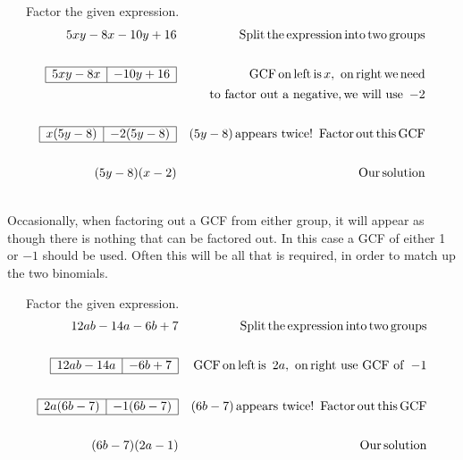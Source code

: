 \begin{example}~~~Factor the given expression.
  \begin{eqnarray*}
    5 x y - 8 x - 10 y + 16 &  & \operatorname{Split} \operatorname{the} \operatorname{expression}
    \operatorname{into} \operatorname{two} \operatorname{groups}\\
&&\\
    \begin{array}{|l|l|}
      \hline
      5 x y - 8 x & - 10 y + 16\\
      \hline
    \end{array} &  & \operatorname{GCF} \operatorname{on} \operatorname{left} \operatorname{is} x, \operatorname{~on}
    \operatorname{right} \operatorname{we} \operatorname{need}\\
		&& ~~~\operatorname{to~factor~out~a~negative}, \operatorname{we~will~use~} - 2\\
&&\\
    \begin{array}{|l|l|}
      \hline
      x (5 y - 8) & - 2 (5 y - 8)\\
      \hline
    \end{array} &  & (5 y - 8) \operatorname{appears~twice} !
    \operatorname{~Factor} \operatorname{out} \operatorname{this} \operatorname{GCF}\\
&&\\
    (5 y - 8) (x - 2) &  & \operatorname{Our} \operatorname{solution}
  \end{eqnarray*}
\end{example}
  ~\\
Occasionally, when factoring out a GCF from either group, it will appear as though there is nothing that can be factored out.  In this case a GCF of either 1 or $- 1$ should be used. Often this will be all that is required, in order to match up the two binomials.

\begin{example}~~~Factor the given expression.
  \begin{eqnarray*}
    12 a b - 14 a - 6 b + 7 &  & \operatorname{Split} \operatorname{the} \operatorname{expression}
    \operatorname{into} \operatorname{two} \operatorname{groups}\\
   &&\\
		\begin{array}{|l|l|}
      \hline
      12 ab - 14 a & - 6 b + 7\\
      \hline
    \end{array} &  & \operatorname{GCF} \operatorname{on} \operatorname{left} \operatorname{is~} 2 a, \operatorname{~on}
    \operatorname{right~use~GCF~of~} - 1\\
   &&\\
	  \begin{array}{|l|l|}
      \hline
      2 a (6 b - 7) & - 1 (6 b - 7)\\
      \hline
    \end{array} &  & (6 b - 7) \operatorname{appears~twice} !
    \operatorname{~Factor} \operatorname{out} \operatorname{this} \operatorname{GCF}\\
   &&\\
	  (6 b - 7) (2 a - 1) &  & \operatorname{Our} \operatorname{solution}
  \end{eqnarray*}
\end{example}

